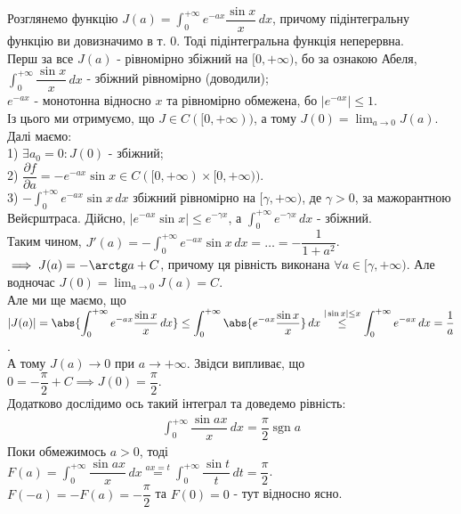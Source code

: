\documentclass[a4paper, 10pt]{article}
\def\departial#1#2{\dfrac{\partial {#1}}{\partial {#2}}}
\def\huge{\displaystyle}
\DeclareMathOperator\sign{sgn}
\theoremstyle{theoremdd}
\theoremstyle{theoremdd}
\theoremstyle{theoremdd}
\theoremstyle{theoremdd}
\theoremstyle{theoremdd}
\theoremstyle{theoremdd}
\theoremstyle{theoremdd}
\theoremstyle{theoremdd}
\theoremstyle{theoremdd}
\begin{document}
Розглянемо функцію $J(a) = \huge\int_0^{+\infty} e^{-ax} \dfrac{\sin x}{x}\,dx$, причому підінтегральну функцію ви довизначимо в т. $0$. Тоді підінтегральна функція неперервна.\\
Перш за все $J(a)$ - рівномірно збіжний на $[0,+\infty)$, бо за ознакою Абеля,\\
$\huge\int_0^{+\infty} \dfrac{\sin x}{x}\,dx$ - збіжний рівномірно (доводили);\\
$e^{-ax}$ - монотонна відносно $x$ та рівномірно обмежена, бо $|e^{-ax}| \leq 1$.\\
Із цього ми отримуємо, що $J \in C([0,+\infty))$, а тому $\huge J(0) = \lim_{a \to 0} J(a)$.\\
Далі маємо:\\
1) $\exists a_0 = 0: J(0)$ - збіжний;\\
2) $\departial{f}{a} = -e^{-ax} \sin x \in C([0,+\infty) \times [0,+\infty))$.\\
3) $-\huge\int_0^{+\infty} e^{-ax}\sin x\,dx$ збіжний рівномірно на $[\gamma,+\infty)$, де $\gamma > 0$, за мажорантною Вейєрштраса. Дійсно,
$|e^{-ax} \sin x| \leq e^{-\gamma x}$, а $\huge\int_0^{+\infty} e^{-\gamma x}\,dx$ - збіжний.\\
Таким чином, $J'(a) = -\huge\int_0^{+\infty} e^{-ax} \sin x \,dx = \dots = -\dfrac{1}{1+a^2}$.\\
$\implies J(a) = -\arctg a + C$, причому ця рівність виконана $\forall a \in [\gamma,+\infty)$.
Але водночас $J(0) = \huge\lim_{a \to 0} J(a) = C$.\\
Але ми ще маємо, що $\huge |J(a)| = \abs{\int_0^{+\infty} e^{-ax} \dfrac{\sin x}{x}\,dx} \leq \int_0^{+\infty} \abs{e^{-ax} \dfrac{\sin x}{x}} \,dx \overset{|\sin x| \leq x}{\leq} \int_0^{+\infty} e^{-ax}\,dx = \dfrac{1}{a}$.\\
А тому $J(a) \to 0$ при $a \to +\infty$. Звідси випливає, що\\
$0 = -\dfrac{\pi}{2} + C \implies J(0) = \dfrac{\pi}{2}$.
\bigskip \\
Додатково дослідимо ось такий інтеграл та доведемо рівність:
\begin{align*}
\int_0^{+\infty} \dfrac{\sin ax}{x}\,dx = \dfrac{\pi}{2} \sign a
\end{align*}
Поки обмежимось $a>0$, тоді\\
$F(a) = \huge\int_0^{+\infty} \dfrac{\sin ax}{x}\,dx \overset{ax = t}{=} \int_0^{+\infty} \dfrac{\sin t}{t}\,dt = \dfrac{\pi}{2}$.\\
$F(-a) = -F(a) = -\dfrac{\pi}{2}$ та $F(0) = 0$ - тут відносно ясно.
\end{document}
